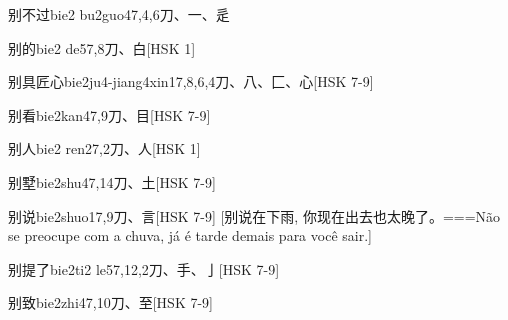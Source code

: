 \begin{EntryWithPhonetic}{别不过}{bie2 bu2guo4}{7,4,6}{⼑、⼀、⾡}
\end{EntryWithPhonetic}

\begin{EntryWithPhonetic}{别的}{bie2 de5}{7,8}{⼑、⽩}[HSK 1]
\end{EntryWithPhonetic}

\begin{EntryWithPhonetic}{别具匠心}{bie2ju4-jiang4xin1}{7,8,6,4}{⼑、⼋、⼕、⼼}[HSK 7-9]
\end{EntryWithPhonetic}

\begin{EntryWithPhonetic}{别看}{bie2kan4}{7,9}{⼑、⽬}[HSK 7-9]
\end{EntryWithPhonetic}

\begin{EntryWithPhonetic}{别人}{bie2 ren2}{7,2}{⼑、⼈}[HSK 1]
\end{EntryWithPhonetic}

\begin{EntryWithPhonetic}{别墅}{bie2shu4}{7,14}{⼑、⼟}[HSK 7-9]
\end{EntryWithPhonetic}

\begin{EntryWithPhonetic}{别说}{bie2shuo1}{7,9}{⼑、⾔}[HSK 7-9]
  [别说在下雨, 你现在出去也太晚了。===Não se preocupe com a chuva, já é tarde demais para você sair.]
\end{EntryWithPhonetic}

\begin{EntryWithPhonetic}{别提了}{bie2ti2 le5}{7,12,2}{⼑、⼿、⼅}[HSK 7-9]
\end{EntryWithPhonetic}

\begin{EntryWithPhonetic}{别致}{bie2zhi4}{7,10}{⼑、⾄}[HSK 7-9]
\end{EntryWithPhonetic}

